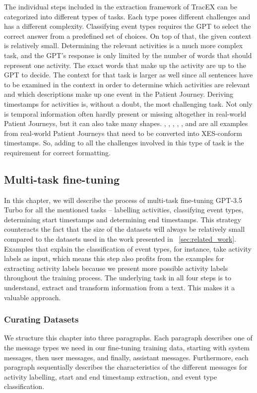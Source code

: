 The individual steps included in the extraction framework of TracEX can be categorized into different types of tasks. Each type poses different challenges and has a different complexity. Classifying event types requires the GPT to select the correct answer from a predefined set of choices. On top of that, the given context is relatively small. Determining the relevant activities is a much more complex task, and the GPT's response is only limited by the number of words that should represent one activity. The exact words that make up the activity are up to the GPT to decide. The context for that task is larger as well since all sentences have to be examined in the context in order to determine which activities are relevant and which descriptions make up one event in the Patient Journey. Deriving timestamps for activities is, without a doubt, the most challenging task. Not only is temporal information often hardly present or missing altogether in real-world Patient Journeys, but it can also take many shapes. , , , , , and  are all examples from real-world Patient Journeys that need to be converted into XES-conform timestamps. So, adding to all the challenges involved in this type of task is the requirement for correct formatting.

\subsection{Multi-task fine-tuning}\label{sec:multi-task-ft}
In this chapter, we will describe the process of multi-task fine-tuning GPT-3.5 Turbo for all the mentioned tasks – labelling activities, classifying event types,  determining start timestamps and determining end timestamps. This strategy counteracts the fact that the size of the datasets will always be relatively small compared to the datasets used in the work presented in ~\autoref{sec:related_work}. Examples that explain the classification of event types, for instance, take activity labels as input, which means this step also profits from the examples for extracting activity labels because we present more possible activity labels throughout the training process. The underlying task in all four steps is to understand, extract and transform information from a text. This makes it a valuable approach.

\subsubsection{Curating Datasets}\label{sec:curating_data}
We structure this chapter into three paragraphs. Each paragraph describes one of the message types we need in our fine-tuning training data, starting with system messages, then user messages, and finally, assistant messages. Furthermore, each paragraph sequentially describes the characteristics of the different messages for activity labelling, start and end timestamp extraction, and event type classification.
